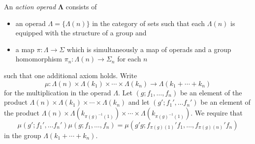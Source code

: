 \documentclass{amsbook} %
\newcommand{\mb}{\mathbf}
\newenvironment{eqn}{\begin{equation}}{\end{equation}}
\numberwithin{section}{chapter}
\begin{document}
\begin{Defi}\label{Defi:aop}
An \textit{action operad} $\mb{\Lambda}$ consists of
\begin{itemize}
\item an operad $\Lambda = \{ \Lambda(n) \}$ in the category of sets such that each $\Lambda(n)$ is equipped with the structure of a group and
\item a map $\pi:\Lambda \rightarrow \Sigma$ which is simultaneously a map of operads and a group homomorphism $\pi_{n}:\Lambda(n) \rightarrow \Sigma_{n}$ for each $n$
\end{itemize}
such that one additional axiom holds.  Write
\[
\mu: \Lambda(n) \times \Lambda(k_{1}) \times \cdots \times \Lambda(k_{n}) \rightarrow \Lambda(k_{1} + \cdots + k_{n})
\]
for the multiplication in the operad $\Lambda$.  Let $(g; f_1, \ldots, f_n)$ be an element of the product $\Lambda(n) \times \Lambda(k_{1}) \times \cdots \times \Lambda(k_{n})$ and let $(g'; f_1', \ldots f_n')$ be an element of the product $\Lambda(n) \times \Lambda(k_{\pi(g)^{-1}(1)}) \times \cdots \times \Lambda(k_{\pi(g)^{-1}(1)})$.  We require that
\begin{eqn}\label{eqn:ao_axiom}
\mu(g'; f_1', \ldots f_n')  \mu(g; f_1, \ldots, f_n) = \mu (g'g; f_{\pi(g)(1)}'f_{1}, \ldots, f_{\pi(g)(n)}'f_{n})
\end{eqn}in the group $\Lambda(k_{1} + \cdots + k_{n})$.
\end{Defi}
\end{document}
